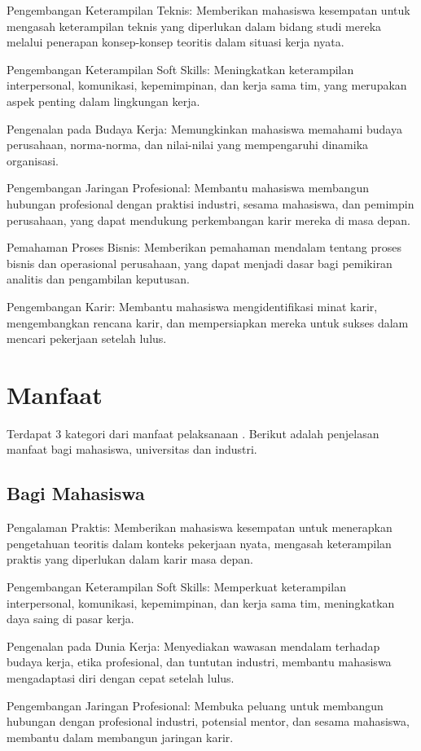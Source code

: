 \begin{packed_enum}
	\item Pengembangan Keterampilan Teknis: Memberikan mahasiswa kesempatan untuk mengasah keterampilan teknis yang diperlukan dalam bidang studi mereka melalui penerapan konsep-konsep teoritis dalam situasi kerja nyata.
	\item Pengembangan Keterampilan Soft Skills: Meningkatkan keterampilan interpersonal, komunikasi, kepemimpinan, dan kerja sama tim, yang merupakan aspek penting dalam lingkungan kerja.
	\item Pengenalan pada Budaya Kerja: Memungkinkan mahasiswa memahami budaya perusahaan, norma-norma, dan nilai-nilai yang mempengaruhi dinamika organisasi.
	\item Pengembangan Jaringan Profesional: Membantu mahasiswa membangun hubungan profesional dengan praktisi industri, sesama mahasiswa, dan pemimpin perusahaan, yang dapat mendukung perkembangan karir mereka di masa depan.
	\item Pemahaman Proses Bisnis: Memberikan pemahaman mendalam tentang proses bisnis dan operasional perusahaan, yang dapat menjadi dasar bagi pemikiran analitis dan pengambilan keputusan.
	\item Pengembangan Karir: Membantu mahasiswa mengidentifikasi minat karir, mengembangkan rencana karir, dan mempersiapkan mereka untuk sukses dalam mencari pekerjaan setelah lulus.
\end{packed_enum}

\section{Manfaat \tipe}
Terdapat 3 kategori dari manfaat pelaksanaan \tipe. Berikut adalah penjelasan manfaat bagi mahasiswa, universitas dan industri.

\subsection{Bagi Mahasiswa}

\begin{packed_enum}
	\item Pengalaman Praktis: Memberikan mahasiswa kesempatan untuk menerapkan pengetahuan teoritis dalam konteks pekerjaan nyata, mengasah keterampilan praktis yang diperlukan dalam karir masa depan.
	\item Pengembangan Keterampilan Soft Skills: Memperkuat keterampilan interpersonal, komunikasi, kepemimpinan, dan kerja sama tim, meningkatkan daya saing di pasar kerja.
	\item Pengenalan pada Dunia Kerja: Menyediakan wawasan mendalam terhadap budaya kerja, etika profesional, dan tuntutan industri, membantu mahasiswa mengadaptasi diri dengan cepat setelah lulus.
	\item Pengembangan Jaringan Profesional: Membuka peluang untuk membangun hubungan dengan profesional industri, potensial mentor, dan sesama mahasiswa, membantu dalam membangun jaringan karir.
\end{packed_enum}

